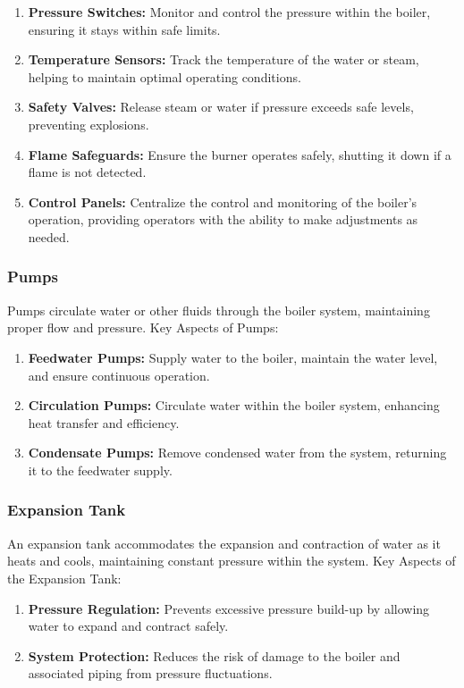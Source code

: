 \begin{enumerate}
    \item \textbf{Pressure Switches:} Monitor and control the pressure within the boiler, ensuring it stays within safe limits.
    \item \textbf{Temperature Sensors:} Track the temperature of the water or steam, helping to maintain optimal operating conditions.
    \item \textbf{Safety Valves:} Release steam or water if pressure exceeds safe levels, preventing explosions.
    \item \textbf{Flame Safeguards:} Ensure the burner operates safely, shutting it down if a flame is not detected.
    \item \textbf{Control Panels:} Centralize the control and monitoring of the boiler's operation, providing operators with the ability to make adjustments as needed.
\end{enumerate}

\subsubsection{Pumps}
Pumps circulate water or other fluids through the boiler system, maintaining proper flow and pressure.
Key Aspects of Pumps:
\begin{enumerate}
    \item \textbf{Feedwater Pumps:} Supply water to the boiler, maintain the water level, and ensure continuous operation.
    \item \textbf{Circulation Pumps:} Circulate water within the boiler system, enhancing heat transfer and efficiency.
    \item \textbf{Condensate Pumps:} Remove condensed water from the system, returning it to the feedwater supply.
\end{enumerate}

\subsubsection{Expansion Tank}
An expansion tank accommodates the expansion and contraction of water as it heats and cools, maintaining constant pressure within the system.
Key Aspects of the Expansion Tank:
\begin{enumerate}
    \item \textbf{Pressure Regulation:} Prevents excessive pressure build-up by allowing water to expand and contract safely.
    \item \textbf{System Protection:} Reduces the risk of damage to the boiler and associated piping from pressure fluctuations.
\end{enumerate}

